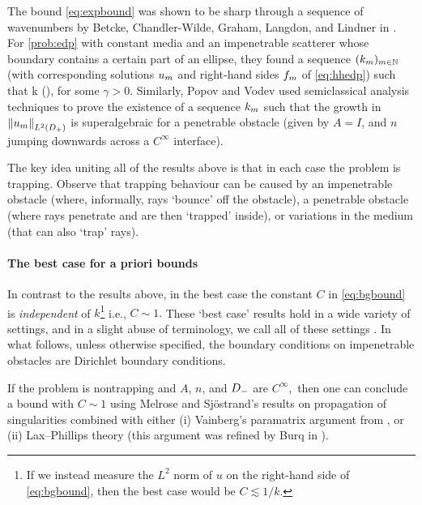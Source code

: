 The bound \eqref{eq:expbound} was shown to be sharp through a sequence of wavenumbers by Betcke, Chandler-Wilde, Graham, Langdon, and Lindner in \cite[Equation 2.22]{BeChGrLaLi:11}. For \cref{prob:edp} with constant media and an impenetrable scatterer whose boundary contains a certain part of an ellipse, they found a sequence $(k_{m})_{m \in \mathbb N}$ (with corresponding solutions $u_{m}$ and right-hand sides $f_{m}$ of \eqref{eq:hhedp}) such that 
\beqs
k\NLtDp{\um} \gtrsim \exp\mleft(\gamma \km\mright)\NLtDp{\fm},
\eeqs
for some $\gamma > 0$. Similarly, Popov and Vodev \cite{PoVo:99a} used semiclassical analysis techniques to prove the existence of a sequence $k_{m}$ such that the growth in $\NLtDp{\um}$ is superalgebraic for a penetrable obstacle (given by $A=I$, and $n$ jumping downwards across a $C^\infty$ interface).

The key idea uniting all of the results above is that in each case the problem is trapping. Observe that trapping behaviour can be caused by an impenetrable obstacle (where, informally, rays `bounce' off the obstacle), a penetrable obstacle (where rays penetrate and are then `trapped' inside), or variations in the medium (that can also `trap' rays).

\paragraph{The best case for a priori bounds} In contrast to the results above, in the best case the constant $C$ in \cref{eq:bgbound} is \emph{independent}  of $k$\footnote{If we instead measure the $L^2$ norm of $u$ on the right-hand side of \cref{eq:bgbound}, then the best case would be $C \lesssim 1/k$.} i.e., $C \sim 1.$ These `best case' results hold in a wide variety of settings, and in a slight abuse of terminology, we call all of these settings . In what follows, unless otherwise specified, the boundary conditions on impenetrable obstacles are Dirichlet boundary conditions.

If the problem is nontrapping and $A$, $n$, and $D_{-}$ are $C^\infty,$ then one can conclude a bound with $C \sim 1$ using Melrose and Sj\"ostrand's results on propagation of singularities \cite{MeSj:82} combined with either (i) Vainberg's paramatrix argument from \cite{Va:75}, or (ii) Lax--Phillips theory \cite{LaPh:??} (this argument was refined by Burq in \cite{Bu:02}).

